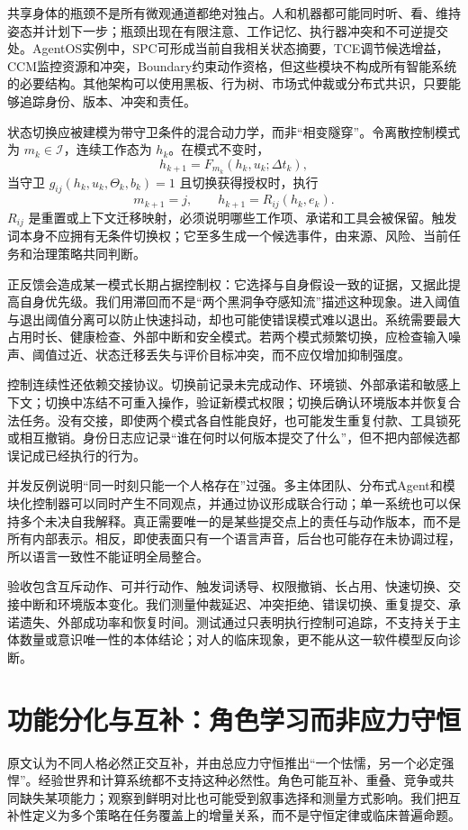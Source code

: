 共享身体的瓶颈不是所有微观通道都绝对独占。人和机器都可能同时听、看、维持姿态并计划下一步；瓶颈出现在有限注意、工作记忆、执行器冲突和不可逆提交处。AgentOS实例中，SPC可形成当前自我相关状态摘要，TCE调节候选增益，CCM监控资源和冲突，Boundary约束动作资格，但这些模块不构成所有智能系统的必要结构。其他架构可以使用黑板、行为树、市场式仲裁或分布式共识，只要能够追踪身份、版本、冲突和责任。

状态切换应被建模为带守卫条件的混合动力学，而非“相变隧穿”。令离散控制模式为 $m_k\in\mathcal I$，连续工作态为 $h_k$。在模式不变时，
\[
h_{k+1}=F_{m_k}(h_k,u_k;\Delta t_k),
\]
当守卫 $g_{ij}(h_k,u_k,\Theta_k,b_k)=1$ 且切换获得授权时，执行
\[
m_{k+1}=j,\qquad
h_{k+1}=R_{ij}(h_k,e_k).
\]
$R_{ij}$ 是重置或上下文迁移映射，必须说明哪些工作项、承诺和工具会被保留。触发词本身不应拥有无条件切换权；它至多生成一个候选事件，由来源、风险、当前任务和治理策略共同判断。

正反馈会造成某一模式长期占据控制权：它选择与自身假设一致的证据，又据此提高自身优先级。我们用滞回而不是“两个黑洞争夺感知流”描述这种现象。进入阈值与退出阈值分离可以防止快速抖动，却也可能使错误模式难以退出。系统需要最大占用时长、健康检查、外部中断和安全模式。若两个模式频繁切换，应检查输入噪声、阈值过近、状态迁移丢失与评价目标冲突，而不应仅增加抑制强度。

控制连续性还依赖交接协议。切换前记录未完成动作、环境锁、外部承诺和敏感上下文；切换中冻结不可重入操作，验证新模式权限；切换后确认环境版本并恢复合法任务。没有交接，即使两个模式各自性能良好，也可能发生重复付款、工具锁死或相互撤销。身份日志应记录“谁在何时以何版本提交了什么”，但不把内部候选都误记成已经执行的行为。

并发反例说明“同一时刻只能一个人格存在”过强。多主体团队、分布式Agent和模块化控制器可以同时产生不同观点，并通过协议形成联合行动；单一系统也可以保持多个未决自我解释。真正需要唯一的是某些提交点上的责任与动作版本，而不是所有内部表示。相反，即使表面只有一个语言声音，后台也可能存在未协调过程，所以语言一致性不能证明全局整合。

验收包含互斥动作、可并行动作、触发词诱导、权限撤销、长占用、快速切换、交接中断和环境版本变化。我们测量仲裁延迟、冲突拒绝、错误切换、重复提交、承诺遗失、外部成功率和恢复时间。测试通过只表明执行控制可追踪，不支持关于主体数量或意识唯一性的本体结论；对人的临床现象，更不能从这一软件模型反向诊断。

\section{功能分化与互补：角色学习而非应力守恒}
\label{sec:complementarity}
原文认为不同人格必然正交互补，并由总应力守恒推出“一个怯懦，另一个必定强悍”。经验世界和计算系统都不支持这种必然性。角色可能互补、重叠、竞争或共同缺失某项能力；观察到鲜明对比也可能受到叙事选择和测量方式影响。我们把互补性定义为多个策略在任务覆盖上的增量关系，而不是守恒定律或临床普遍命题。

